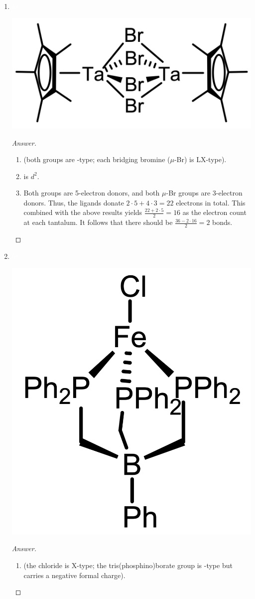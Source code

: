 \documentclass[../psets.tex]{subfiles}
\begin{document}
\begin{enumerate}
\begin{enumerate}[label={\arabic*)}]
\begin{proof}[Answer]
\begin{enumerate}[label={(\roman*)}]
            \end{enumerate}
        \end{proof}
        \item ${\color{white}hi}$
        \begin{center}
            \includegraphics[width=0.34\linewidth]{../ExtFiles/pset1-1-14.png}
        \end{center}
        \begin{proof}[Answer]\leavevmode
            \begin{enumerate}[label={(\roman*)}]
                \item {} (both  groups are -type; each bridging bromine ($\mu$-Br) is LX-type).
                \item {} is $d^2$.
                \item Both  groups are 5-electron donors, and both $\mu$-Br groups are 3-electron donors. Thus, the ligands donate $2\cdot 5+4\cdot 3=22$ electrons in total. This combined with the above results yields $\frac{22+2\cdot 5}{2}=16$ as the electron count at each tantalum. It follows that there should be $\frac{36-2\cdot 16}{2}=2$  bonds.
            \end{enumerate}
        \end{proof}
        \item ${\color{white}hi}$
        \vspace{-1em}
        \begin{center}
            \includegraphics[width=0.22\linewidth]{../ExtFiles/pset1-1-15.png}
        \end{center}
        \begin{proof}[Answer]\leavevmode
            \begin{enumerate}[label={(\roman*)}]
                \item {} (the chloride is X-type; the tris(phosphino)borate group is -type but carries a negative formal charge).

\end{enumerate}
\end{proof}
\end{enumerate}
\end{enumerate}
\end{document}
